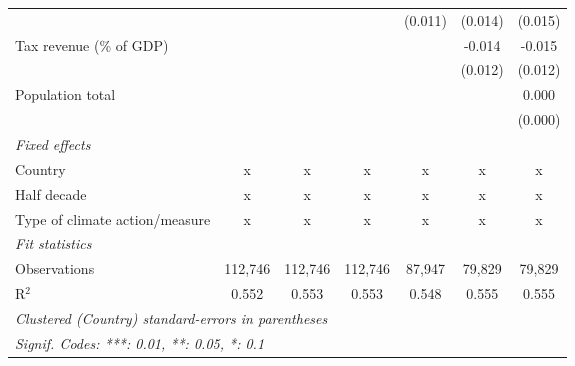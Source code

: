 \begin{tabular}{lcccccc}
                                                        &         &                &                & (0.011)        & (0.014)        & (0.015)\\   
   Tax revenue (\% of GDP)                              &         &                &                &                & -0.014         & -0.015\\   
                                                        &         &                &                &                & (0.012)        & (0.012)\\   
   Population total                                     &         &                &                &                &                & 0.000\\   
                                                        &         &                &                &                &                & (0.000)\\   
   \emph{Fixed effects}\\
   Country                                              & x       & x              & x              & x              & x              & x\\  
   Half decade                                          & x       & x              & x              & x              & x              & x\\  
   Type of climate action/measure                       & x       & x              & x              & x              & x              & x\\  
   \midrule \emph{Fit statistics}\\
   Observations                                         & 112,746 & 112,746        & 112,746        & 87,947         & 79,829         & 79,829\\  
   R$^2$                                                & 0.552   & 0.553          & 0.553          & 0.548          & 0.555          & 0.555\\  
   \midrule
   \multicolumn{7}{l}{\emph{Clustered (Country) standard-errors in parentheses}}\\
   \multicolumn{7}{l}{\emph{Signif. Codes: ***: 0.01, **: 0.05, *: 0.1}}\\
\end{tabular}
\par\endgroup


